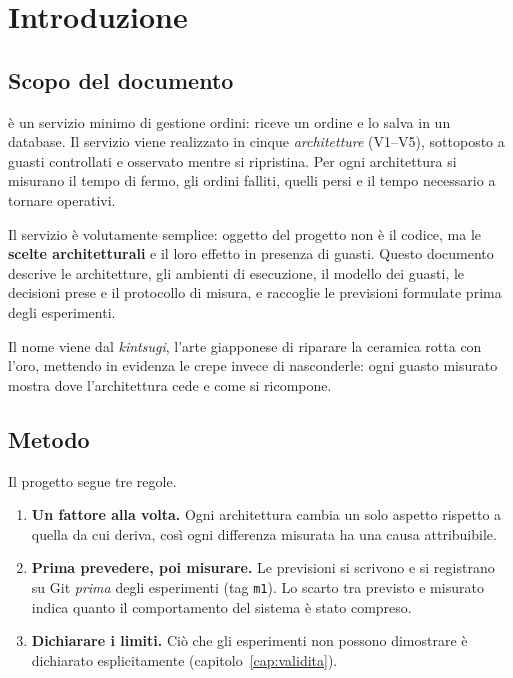 \chapter{Introduzione}
\label{cap:introduzione}

\section{Scopo del documento}

\progetto{} è un servizio minimo di gestione ordini: riceve un ordine e lo salva in un database. Il servizio viene realizzato in cinque \emph{architetture} (V1--V5), sottoposto a guasti controllati e osservato mentre si ripristina. Per ogni architettura si misurano il tempo di fermo, gli ordini falliti, quelli persi e il tempo necessario a tornare operativi.

Il servizio è volutamente semplice: oggetto del progetto non è il codice, ma le \textbf{scelte architetturali} e il loro effetto in presenza di guasti. Questo documento descrive le architetture, gli ambienti di esecuzione, il modello dei guasti, le decisioni prese e il protocollo di misura, e raccoglie le previsioni formulate prima degli esperimenti.

Il nome viene dal \textit{kintsugi}, l'arte giapponese di riparare la ceramica rotta con l'oro, mettendo in evidenza le crepe invece di nasconderle: ogni guasto misurato mostra dove l'architettura cede e come si ricompone.

\section{Metodo}

Il progetto segue tre regole.

\begin{enumerate}
  \item \textbf{Un fattore alla volta.} Ogni architettura cambia un solo aspetto rispetto a quella da cui deriva, così ogni differenza misurata ha una causa attribuibile.
  \item \textbf{Prima prevedere, poi misurare.} Le previsioni si scrivono e si registrano su Git \emph{prima} degli esperimenti (tag \texttt{m1}). Lo scarto tra previsto e misurato indica quanto il comportamento del sistema è stato compreso.
  \item \textbf{Dichiarare i limiti.} Ciò che gli esperimenti non possono dimostrare è dichiarato esplicitamente (capitolo~\ref{cap:validita}).
\end{enumerate}

